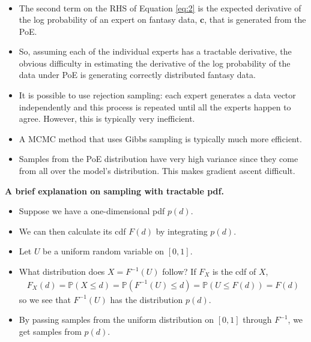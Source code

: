 \documentclass[10pt]{article}
\newcommand{\PP}{\mathbb{P}}
\begin{document}
\begin{itemize}
\begin{align}
\end{align}
\item The second term on the RHS of Equation \eqref{eq:2} is the expected derivative of the log probability of an expert on fantasy data, $\mathbf{c}$, that is generated from the PoE.
\item So, assuming each of the individual experts has a tractable derivative, the obvious difficulty in estimating the derivative of the log probability of the data under PoE is generating correctly distributed fantasy data.
\item It is possible to use rejection sampling: each expert generates a data vector independently and this process is repeated until all the experts happen to agree. However, this is typically very inefficient.
\item A MCMC method that uses Gibbs sampling is typically much more efficient.
\item Samples from the PoE distribution have very high variance since they come from all over the model's distribution. This makes gradient ascent difficult.
\end{itemize}

\newpage

\textbf{A brief explanation on sampling with tractable pdf.}
\begin{itemize}
\item Suppose we have a one-dimensional pdf $p(d)$.
\item We can then calculate its cdf $F(d)$ by integrating $p(d)$.
\item Let $U$ be a uniform random variable on $[0,1]$.
\item What distribution does $X = F^{-1}(U)$ follow? If $F_X$ is the cdf of $X$,
\begin{align*}
F_X(d) = \PP(X \leq d) = \PP(F^{-1}(U) \leq d) = \PP(U \leq F(d)) = F(d)
\end{align*}
so we see that $F^{-1}(U)$ has the distribution $p(d)$.
\item By passing samples from the uniform distribution on $[0,1]$ through $F^{-1}$, we get samples from $p(d)$.
\end{itemize}
\end{document}
